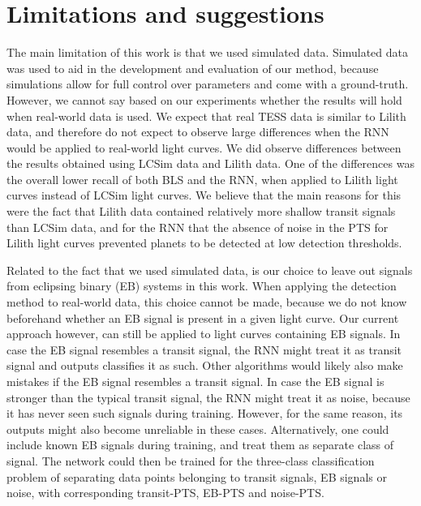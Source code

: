 
\section{Limitations and suggestions}

The main limitation of this work is that we used simulated data. Simulated data was used to aid in the development and evaluation of our method,  because simulations allow for full control over parameters and come with a ground-truth. However, we cannot say based on our experiments whether the results will hold when real-world data is used. We expect that real TESS data is similar to Lilith data, and therefore do not expect to observe large differences when the RNN would be applied to real-world light curves. We did observe differences between the results obtained using LCSim data and Lilith data. One of the differences was the overall lower recall of both BLS and the RNN, when applied to Lilith light curves instead of LCSim light curves. We believe that the main reasons for this were the fact that Lilith data contained relatively more shallow transit signals than LCSim data, and for the RNN that the absence of noise in the PTS for Lilith light curves prevented planets to be detected at low detection thresholds. 

Related to the fact that we used simulated data, is our choice to leave out signals from eclipsing binary (EB) systems in this work. When applying the detection method to real-world data, this choice cannot be made, because we do not know beforehand whether an EB signal is present in a given light curve. Our current approach however, can still be applied to  light curves containing EB signals. In case the EB signal resembles a transit signal, the RNN might treat it as transit signal and outputs classifies it as such. Other algorithms would likely also make mistakes if the EB signal resembles a transit signal. In case the EB signal is stronger than the typical transit signal, the RNN might treat it as noise, because it has never seen such signals during training. However, for the same reason, its outputs might also become unreliable in these cases. Alternatively, one could include known EB signals during training, and treat them as separate class of signal. The network could then be trained for the three-class classification problem of separating data points belonging to transit signals, EB signals or noise, with corresponding transit-PTS, EB-PTS and noise-PTS.

